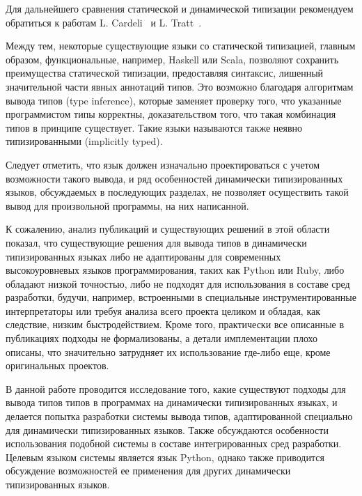 Для дальнейшего сравнения статической и динамической типизации рекомендуем
обратиться к работам L. Cardeli~\cite{Cardelli2004} и L. Tratt~\cite[]{Tratt2009}.
 
Между тем, некоторые существующие языки со статической типизацией, главным
образом, функциональные, например, Haskell или Scala, позволяют сохранить
преимущества статической типизации, предоставляя синтаксис, лишенный
значительной части явных аннотаций типов. Это возможно благодаря алгоритмам
вывода типов (type inference), которые заменяет проверку того, что указанные
программистом типы корректны, доказательством того, что такая комбинация типов
в принципе существует. Такие языки называются также неявно типизированными
(implicitly typed). 

Следует отметить, что язык должен изначально проектироваться с учетом
возможности такого вывода, и ряд особенностей динамически типизированных
языков, обсуждаемых в последующих разделах, не позволяет осуществить такой
вывод для произвольной программы, на них написанной. 

К сожалению, анализ публикаций и существующих решений в этой области показал,
что существующие решения для вывода типов в динамически типизированных языках
либо не адаптированы для современных высокоуровневых языков программирования,
таких как Python или Ruby, либо обладают низкой точностью, либо не подходят
для использования в составе сред разработки, будучи, например, встроенными в
специальные инструментированные интерпретаторы или требуя анализа всего
проекта целиком и обладая, как следствие, низким быстродействием. Кроме того,
практически все описанные в публикациях подходы не формализованы, а детали
имплементации плохо описаны, что значительно затрудняет их использование
где-либо еще, кроме оригинальных проектов.

В данной работе проводится исследование того, какие существуют подходы для
вывода типов типов в программах на динамически типизированных языках, и
делается попытка разработки системы вывода типов, адаптированной специально
для динамически типизированных языков. Также обсуждаются особенности
использования подобной системы в составе интегрированных сред разработки.
Целевым языком системы является язык Python, однако также приводится
обсуждение возможностей ее применения для других динамически типизированных
языков. 
